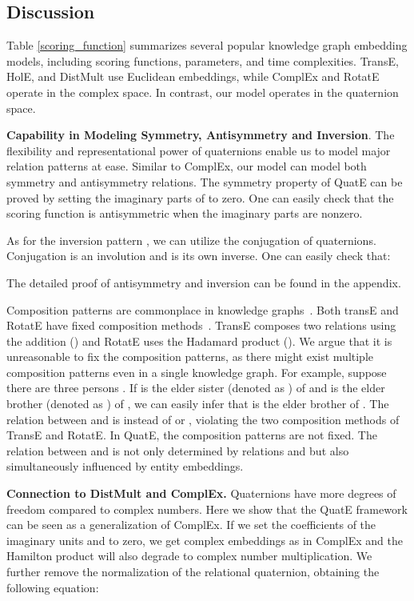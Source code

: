 \documentclass{article}
\begin{document}
\subsection{Discussion}
Table \ref{scoring_function} summarizes several popular knowledge graph embedding models, including scoring functions, parameters, and time complexities. TransE, HolE, and DistMult use Euclidean embeddings, while ComplEx and RotatE operate in the complex space. In contrast, our model operates in the quaternion space.






\textbf{Capability in Modeling Symmetry, Antisymmetry and Inversion}. The flexibility and representational power of quaternions enable us to model major relation patterns at ease. Similar to ComplEx, our model can model both symmetry  and antisymmetry  relations. The symmetry property of QuatE can be proved by setting the imaginary parts of  to zero. One can easily check that the scoring function is antisymmetric when the imaginary parts are nonzero.

As for the inversion pattern  , we can utilize the conjugation of quaternions. Conjugation is an involution and is its own inverse. One can easily check that:

The detailed proof of antisymmetry and inversion can be found in the appendix.

Composition patterns are commonplace in knowledge graphs~\citep{lao2011random,neelakantan2015compositional}. Both transE and RotatE have fixed composition methods~\citep{sun2019rotate}. TransE composes two relations using the addition () and RotatE uses the Hadamard product (). We argue that it is unreasonable to fix the composition patterns, as there might exist multiple composition patterns even in a single knowledge graph. For example, suppose there are three persons . If  is the elder sister (denoted as ) of  and  is the elder brother (denoted as ) of , we can easily infer that  is the elder brother of . The relation between  and  is  instead of  or , violating the two composition methods of TransE and RotatE. In QuatE, the composition patterns are not fixed. The relation between  and  is not only determined by relations  and  but also simultaneously influenced by entity embeddings.





\textbf{Connection to DistMult and ComplEx.} Quaternions have more degrees of freedom compared to complex numbers. Here we show that the QuatE framework can be seen as a generalization of ComplEx. If we set the coefficients of the imaginary units  and  to zero, we get complex embeddings as in ComplEx and the Hamilton product will also degrade to complex number multiplication. We further remove the normalization of the relational quaternion, obtaining the following equation:
\end{document}
